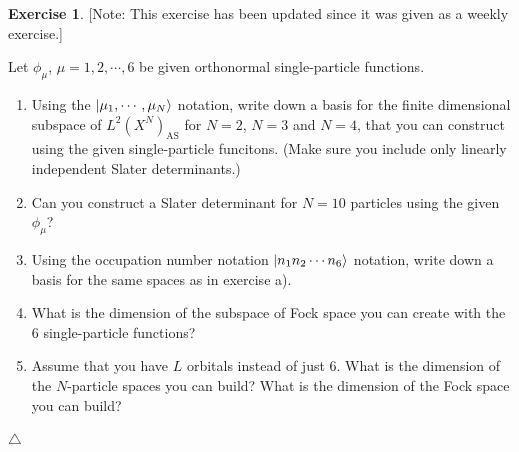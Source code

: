 \documentclass{report}
\theoremstyle{plain}
\theoremstyle{definition}
\newtheorem{exerc}{Exercise}[chapter]
\newcommand\xqed[1]{%
  \leavevmode\unskip\penalty9999 \hbox{}\nobreak\hfill
  \quad\hbox{#1}}
\newcommand\demo{\xqed{$\triangle$}}
\newenvironment{exercise}{\bigskip\begin{exerc}}{\demo\end{exerc}\bigskip}
\begin{document}
\begin{exercise}\label{exercise:finite} [Note: This exercise has been
  updated since it was given as a weekly exercise.]

  Let $\phi_\mu$, $\mu=1,2,\cdots,6$ be given orthonormal
  single-particle functions.

  \begin{enumerate}
    \item[a)]
      Using the $\ket{\mu_1,\cdots,\mu_N}$ notation, write down a basis
  for the finite dimensional subspace of $L^2(X^N)_\text{AS}$ for
  $N=2$, $N=3$ and 
  $N=4$, that you can construct using the given single-particle funcitons. (Make sure
  you include only linearly independent Slater determinants.)
  \item[b)]
  Can you construct a Slater determinant for $N=10$ particles using
  the given $\phi_\mu$?

  \item[c)] Using the occupation number notation $\ket{n_1 n_2 \cdots n_6}$
  notation, write down a basis for the same spaces as in exercise a).

  \item[c)] What is the dimension of the subspace of Fock space you can
  create with the $6$ single-particle functions?

  \item[e)] Assume that you have $L$ orbitals instead of just $6$. What is
  the dimension of the $N$-particle spaces you can build? What is the
  dimension of the Fock space you can build?
\end{enumerate}
\end{exercise}
\end{document}

